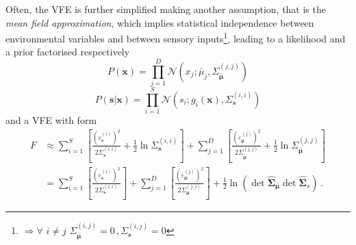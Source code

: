 \documentclass[a4paper, 10pt]{article}
\begin{document}
Often, the VFE is further simplified making another assumption, that is the \emph{mean field approximation}, which implies statistical independence between environmental variables and between sensory inputs\footnote{$\Rightarrow \forall \, \, i \neq j \, \, \Sigma_{\bar{\bm \mu}}^{(i,j)}=0 \, , \Sigma_{\mathbf s}^{(i,j)}=0 $}, leading to a likelihood and a prior factorised respectively 
\begin{equation}
P(\mathbf x) = \prod_{j=1}^{D} \mathcal{N}(x_{j}; \bar{\mu}_{j}, \Sigma_{\bar{\bm \mu}}^{(j,j)})
\end{equation}
\begin{equation}
P(\mathbf s | \mathbf x) = \prod_{i=1}^{S} \mathcal{N}(s_{i}; g_{i}(\mathbf x), \Sigma_{\mathbf s}^{(i,i)})
\end{equation}
and a VFE with form
\begin{equation}
\begin{split}
F &\approx \sum_{i=1}^S \left[ \frac{(\varepsilon_{\mathbf s}^{(i)})^2}{2 \Sigma_{\mathbf s}^{(i,i)}} + \frac{1}{2} \ln \Sigma_{\mathbf s}^{(i,i)}  \right] + \sum_{j=1}^D \left[ \frac{(\varepsilon_{\bm \mu}^{(j)})^2}{2 \Sigma_{\bar{\bm \mu}}^{(j,j)}} + \frac{1}{2} \ln \Sigma_{\bar{\bm \mu}}^{(j,j)}  \right] \\
	&= \sum_{i=1}^S \left[ \frac{(\varepsilon_{\mathbf s}^{(i)})^2}{2 \Sigma_{\mathbf s}^{(i,i)}} \right] + \sum_{j=1}^D \left[ \frac{(\varepsilon_{\bm \mu}^{(j)})^2}{2 \Sigma_{\bm \mu}^{(j,j)}} \right] + \frac{1}{2} \ln \left( \det \bm{\hat{\Sigma}}_{\bar{\bm \mu}} \det \bm{\hat{\Sigma}}_{s} \right) \, .
\end{split}
\end{equation}





\newpage

\printbibliography
\end{document}
